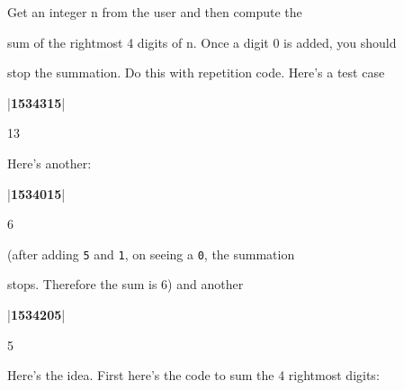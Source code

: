 Get an integer n from the user and then compute the

sum of the rightmost 4 digits of n. Once a digit 0 is added, you should

stop the summation. Do this with repetition code. Here's a test case



\begin{consolethree}[escapeinside=||]

|\textbf{1534315}|



13 

\end{consolethree}





Here's another:



\begin{consolethree}[escapeinside=||]

|\textbf{1534015}|



6 

\end{consolethree}





(after adding \texttt{5} and \texttt{1}, on seeing a \texttt{0}, the summation

stops. Therefore the sum is 6) and another





\begin{consolethree}[escapeinside=||]

|\textbf{1534205}|



5 

\end{consolethree}



Here's the idea. First here's the code to sum the 4 rightmost digits:




